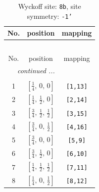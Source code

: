 \documentclass[fleqn,8pt]{jsarticle}
\begin{document}
\begin{longtable}{ccc}
\caption{Wyckoff site: {\tt 8b}, site symmetry: {\tt -1'}}
 \\
 \hline \hline
No. & position & mapping \\ \hline \endfirsthead

\multicolumn{2}{l}{\tablename\ \thetable{}} \\
 \hline \hline
No. & position & mapping \\ \hline \endhead

 \hline \hline
\multicolumn{2}{r}{\footnotesize\it continued ...} \\ \endfoot

 \hline \hline
\multicolumn{2}{r}{} \\ \endlastfoot

1 & $\left[ \frac{1}{4},\, 0,\, 0 \right]$ & {\tt [1,13]} \\ \hline
2 & $\left[ \frac{1}{4},\, \frac{1}{2},\, 0 \right]$ & {\tt [2,14]} \\ \hline
3 & $\left[ \frac{3}{4},\, \frac{1}{2},\, \frac{1}{2} \right]$ & {\tt [3,15]} \\ \hline
4 & $\left[ \frac{3}{4},\, 0,\, \frac{1}{2} \right]$ & {\tt [4,16]} \\ \hline
5 & $\left[ \frac{3}{4},\, 0,\, 0 \right]$ & {\tt [5,9]} \\ \hline
6 & $\left[ \frac{3}{4},\, \frac{1}{2},\, 0 \right]$ & {\tt [6,10]} \\ \hline
7 & $\left[ \frac{1}{4},\, \frac{1}{2},\, \frac{1}{2} \right]$ & {\tt [7,11]} \\ \hline
8 & $\left[ \frac{1}{4},\, 0,\, \frac{1}{2} \right]$ & {\tt [8,12]} \\
\end{longtable}
\renewcommand{\arraystretch}{1.2}
\end{document}
